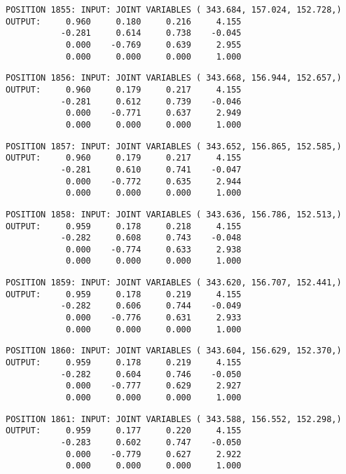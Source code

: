 \begin{verbatim}
POSITION 1855: INPUT: JOINT VARIABLES ( 343.684, 157.024, 152.728,)
OUTPUT:     0.960     0.180     0.216     4.155
           -0.281     0.614     0.738    -0.045
            0.000    -0.769     0.639     2.955
            0.000     0.000     0.000     1.000
\end{verbatim} \pagebreak[1]\begin{verbatim}
POSITION 1856: INPUT: JOINT VARIABLES ( 343.668, 156.944, 152.657,)
OUTPUT:     0.960     0.179     0.217     4.155
           -0.281     0.612     0.739    -0.046
            0.000    -0.771     0.637     2.949
            0.000     0.000     0.000     1.000
\end{verbatim} \pagebreak[1]\begin{verbatim}
POSITION 1857: INPUT: JOINT VARIABLES ( 343.652, 156.865, 152.585,)
OUTPUT:     0.960     0.179     0.217     4.155
           -0.281     0.610     0.741    -0.047
            0.000    -0.772     0.635     2.944
            0.000     0.000     0.000     1.000
\end{verbatim} \pagebreak[1]\begin{verbatim}
POSITION 1858: INPUT: JOINT VARIABLES ( 343.636, 156.786, 152.513,)
OUTPUT:     0.959     0.178     0.218     4.155
           -0.282     0.608     0.743    -0.048
            0.000    -0.774     0.633     2.938
            0.000     0.000     0.000     1.000
\end{verbatim} \pagebreak[1]\begin{verbatim}
POSITION 1859: INPUT: JOINT VARIABLES ( 343.620, 156.707, 152.441,)
OUTPUT:     0.959     0.178     0.219     4.155
           -0.282     0.606     0.744    -0.049
            0.000    -0.776     0.631     2.933
            0.000     0.000     0.000     1.000
\end{verbatim} \pagebreak[1]\begin{verbatim}
POSITION 1860: INPUT: JOINT VARIABLES ( 343.604, 156.629, 152.370,)
OUTPUT:     0.959     0.178     0.219     4.155
           -0.282     0.604     0.746    -0.050
            0.000    -0.777     0.629     2.927
            0.000     0.000     0.000     1.000
\end{verbatim} \pagebreak[1]\begin{verbatim}
POSITION 1861: INPUT: JOINT VARIABLES ( 343.588, 156.552, 152.298,)
OUTPUT:     0.959     0.177     0.220     4.155
           -0.283     0.602     0.747    -0.050
            0.000    -0.779     0.627     2.922
            0.000     0.000     0.000     1.000
\end{verbatim} \pagebreak[1]\begin{verbatim}

\end{verbatim}
